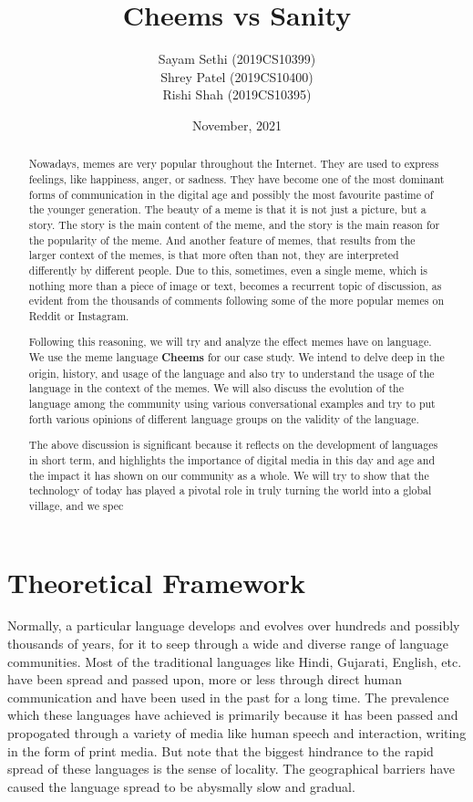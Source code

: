 \documentclass{article}
\title{Cheems vs Sanity}
\author{Sayam Sethi (2019CS10399)\\Shrey Patel (2019CS10400)\\Rishi Shah (2019CS10395)}
\date{November, 2021}
\begin{document}
\maketitle

\tableofcontents

\newpage

\begin{abstract}
    Nowadays, memes are very popular throughout the Internet. They are used to express feelings, like happiness, anger, or sadness. They have become one of the most dominant forms of communication in the digital age and possibly the most favourite pastime of the younger generation. The beauty of a meme is that it is not just a picture, but a story. The story is the main content of the meme, and the story is the main reason for the popularity of the meme. And another feature of memes, that results from the larger context of the memes,  is that more often than not, they are interpreted differently by different people. Due to this, sometimes, even a single meme, which is nothing more than a piece of image or text, becomes a recurrent topic of discussion, as evident from the thousands of comments following some of the more popular memes on Reddit or Instagram.

    Following this reasoning, we will try and analyze the effect memes have on language. We use the meme language \textbf{Cheems} for our case study. We intend to delve deep in the origin, history, and usage of the language and also try to understand the usage of the language in the context of the memes. We will also discuss the evolution of the language among the community using various conversational examples and try to put forth various opinions of different language groups on the validity of the language.

    The above discussion is significant because it reflects on the development of languages in short term, and highlights the importance of digital media in this day and age and the impact it has shown on our community as a whole. We will try to show that the technology of today has played a pivotal role in truly turning the world into a global village, and we spec
\end{abstract}

\section{Theoretical Framework}
Normally, a particular language develops and evolves over hundreds and possibly thousands of years, for it to seep through a wide and diverse range of language communities. Most of the traditional languages like Hindi, Gujarati, English, etc. have been spread and passed upon, more or less through direct human communication and have been used in the past for a long time.  The prevalence which these languages have achieved is primarily because it has been passed and propogated through a variety of media like human speech and interaction, writing in the form of print media. But note that the biggest hindrance to the rapid spread of these languages is the sense of locality. The geographical barriers have caused the language spread to be abysmally slow and gradual.
\end{document}
